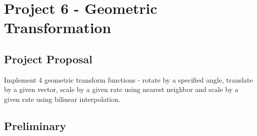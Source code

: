 \section{Project 6 - Geometric Transformation}

\subsection{Project Proposal}
Implement 4 geometric transform functions - rotate by a specified angle, translate by a given vector, scale by a given rate using nearest neighbor and scale by a given rate using bilinear interpolation.

\subsection{Preliminary}
